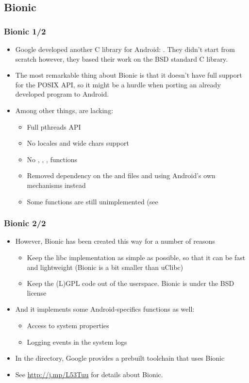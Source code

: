 \subsection{Bionic}
\begin{frame}
  \frametitle{Bionic 1/2}
  \begin{itemize}
  \item Google developed another C library for Android:
    . They didn't start from scratch however, they
    based their work on the BSD standard C library.
  \item The most remarkable thing about Bionic is that it doesn't have
    full support for the POSIX API, so it might be a hurdle when porting an
    already developed program to Android.
  \item Among other things, are lacking:
    \begin{itemize}
    \item Full pthreads API
    \item No locales and wide chars support
    \item No , , , functions
    \item Removed dependency on the  and
       files and using Android's own mechanisms instead
    \item Some functions are still unimplemented (see
    \end{itemize}
  \end{itemize}
\end{frame}

\begin{frame}
  \frametitle{Bionic 2/2}
  \begin{itemize}
  \item However, Bionic has been created this way for a number of
    reasons
    \begin{itemize}
    \item Keep the libc implementation as simple as possible, so that
      it can be fast and lightweight (Bionic is a bit smaller than
      uClibc)
    \item Keep the (L)GPL code out of the userspace. Bionic is under
      the BSD license
    \end{itemize}
  \item And it implements some Android-specifics functions as well:
    \begin{itemize}
    \item Access to system properties
    \item Logging events in the system logs
    \end{itemize}
  \item In the  directory, Google provides a prebuilt toolchain
    that uses Bionic
  \item See \url{http://j.mp/L53Tuu} for details about Bionic.
  \end{itemize}
\end{frame}
